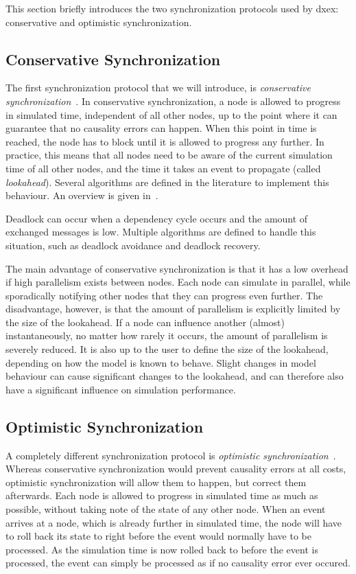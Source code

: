 This section briefly introduces the two synchronization protocols used by dxex: conservative and optimistic synchronization.

\subsection{Conservative Synchronization}
The first synchronization protocol that we will introduce, is \textit{conservative synchronization}~\cite{FujimotoBook}.
In conservative synchronization, a node is allowed to progress in simulated time, independent of all other nodes, up to the point where it can guarantee that no causality errors can happen.
When this point in time is reached, the node has to block until it is allowed to progress any further.
In practice, this means that all nodes need to be aware of the current simulation time of all other nodes, and the time it takes an event to propagate (called \textit{lookahead}).
Several algorithms are defined in the literature to implement this behaviour.
An overview is given in~\cite{FujimotoBook}.

Deadlock can occur when a dependency cycle occurs and the amount of exchanged messages is low.
Multiple algorithms are defined to handle this situation, such as deadlock avoidance and deadlock recovery.

The main advantage of conservative synchronization is that it has a low overhead if high parallelism exists between nodes.
Each node can simulate in parallel, while sporadically notifying other nodes that they can progress even further.
The disadvantage, however, is that the amount of parallelism is explicitly limited by the size of the lookahead.
If a node can influence another (almost) instantaneously, no matter how rarely it occurs, the amount of parallelism is severely reduced.
It is also up to the user to define the size of the lookahead, depending on how the model is known to behave.
Slight changes in model behaviour can cause significant changes to the lookahead, and can therefore also have a significant influence on simulation performance.

\subsection{Optimistic Synchronization}
A completely different synchronization protocol is \textit{optimistic synchronization}~\cite{TimeWarp}.
Whereas conservative synchronization would prevent causality errors at all costs, optimistic synchronization will allow them to happen, but correct them afterwards.
Each node is allowed to progress in simulated time as much as possible, without taking note of the state of any other node.
When an event arrives at a node, which is already further in simulated time, the node will have to roll back its state to right before the event would normally have to be processed.
As the simulation time is now rolled back to before the event is processed, the event can simply be processed as if no causality error ever occured.

